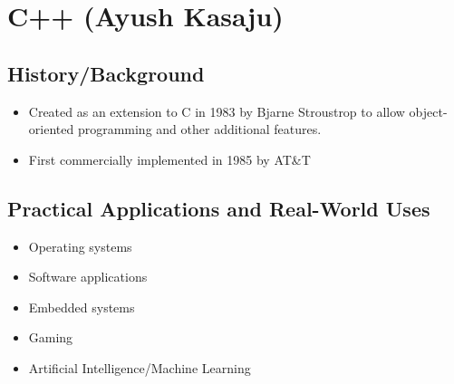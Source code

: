 \section{C++ (Ayush Kasaju)}

\subsection{History/Background}
\begin{itemize}
	\item Created as an extension to C in 1983 by Bjarne Stroustrop to allow object-oriented programming and other additional features. \cite{albatross_history_nodate}
	\item First commercially implemented in 1985 by AT\&T
\end{itemize}

\subsection{Practical Applications and Real-World Uses \cite{simplilearn_what_2021}}
\begin{itemize}
	\item Operating systems
	\item Software applications
	\item Embedded systems
	\item Gaming
	\item Artificial Intelligence/Machine Learning
\end{itemize}

